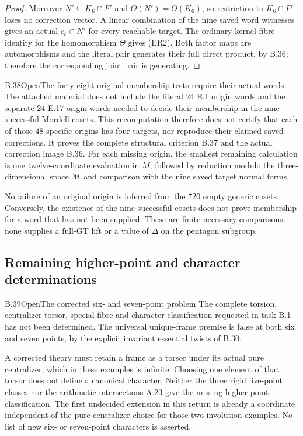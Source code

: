 \begin{proof}
Moreover $N'\subseteq K_6\cap F'$ and
$\Theta(N')=\Theta(K_6)$, so restriction to $K_6\cap F'$ loses
no correction vector. A linear combination of the nine saved
word witnesses gives an actual $c_t\in N'$ for every reachable
target. The ordinary kernel-fibre identity for the homomorphism
$\Theta$ gives (ER2). Both factor maps are automorphisms and the
literal pair generates their full direct product, by B.36;
therefore the corresponding joint pair is generating.
\end{proof}

\begin{statement}{B.38}{Open}{The forty-eight original membership tests require their actual words}
The attached material does not include the literal $24$ E.1
origin words and the separate $24$ E.17 origin words needed to
decide their membership in the nine successful Mordell cosets.
This recomputation therefore does not certify that each of those
$48$ specific origins has four targets, nor reproduce their
claimed saved corrections. It proves the complete structural
criterion B.37 and the actual correction image B.36.
For each missing origin, the smallest remaining calculation is
one twelve-coordinate evaluation in $M$, followed by reduction
modulo the three-dimensional space $\mathcal M$ and comparison
with the nine saved target normal forms.
\end{statement}
No failure of an original origin is inferred from the $720$ empty
generic cosets. Conversely, the existence of the nine successful
cosets does not prove membership for a word that has not been supplied.
These are finite necessary comparisons; none supplies a full-GT
lift or a value of $\Delta$ on the pentagon subgroup.

\subsection{Remaining higher-point and character determinations}


\begin{statement}{B.39}{Open}{The corrected six- and seven-point problem}
The complete torsion, centralizer-torsor, special-fibre and
character classification requested in task B.1 has not been
determined. The universal unique-frame premise is false at
both six and seven points, by the explicit invariant essential
twists of B.30.
\end{statement}
A corrected theory must retain a frame as a torsor under its
actual pure centralizer, which in these examples is infinite.
Choosing one element of that torsor does not define a canonical
character. Neither the three rigid five-point classes nor the
arithmetic intersections A.23 give the missing higher-point
classification. The first undecided extension in this return
is already a coordinate independent of the pure-centralizer
choice for those two involution examples. No list of new
six- or seven-point characters is asserted.

